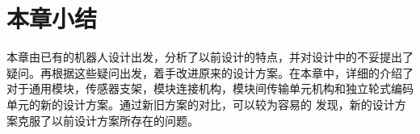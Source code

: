 \section{本章小结}
本章由已有的机器人设计出发，分析了以前设计的特点，并对设计中的不妥提出了疑问。再根据这些疑问出发，着手改进原来的设计方案。在本章中，详细的介绍了对于通用模块，传感器支架，模块连接机构，模块间传输单元机构和独立轮式编码单元的新的设计方案。通过新旧方案的对比，可以较为容易的 发现，新的设计方案克服了以前设计方案所存在的问题。
